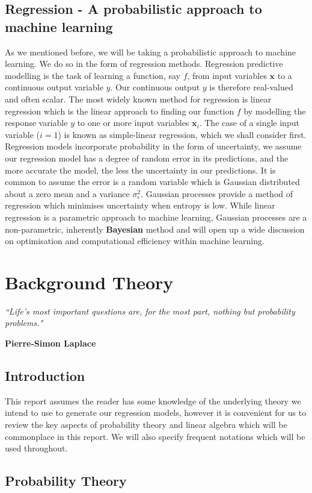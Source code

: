\documentclass[10pt,a4paper]{article}
\numberwithin{equation}{section}
\theoremstyle{plain}
\theoremstyle{own}
\begin{document}
\subsection*{Regression - A probabilistic approach to machine learning}
As we mentioned before, we will be taking a probabilistic approach to machine learning. We do so in the form of regression methods. Regression predictive modelling is the task of learning a function, say $f$, from input variables $\mathbf{x}$ to a continuous output variable $y$. Our continuous output $y$ is therefore real-valued and often scalar. The most widely known method for regression is linear regression which is the linear approach to finding our function $f$ by modelling the response variable $y$ to one or more input variables $\mathbf{x}_i$. The case of a single input variable ($i = 1$) is known as simple-linear regression, which we shall consider first. Regression models incorporate probability in the form of uncertainty, we assume our regression model has a degree of random error in its predictions, and the more accurate the model, the less the uncertainty in our predictions. It is common to assume the error is a random variable which is Gaussian distributed about a zero mean and a variance $\sigma_\epsilon^2$. Gaussian processes provide a method of regression which minimises uncertainty when entropy is low. While linear regression is a parametric approach to machine learning, Gaussian processes are a non-parametric, inherently \textbf{Bayesian} method and will open up a wide discussion on optimisation and computational efficiency within machine learning.
\pagebreak
\section{Background Theory}
\epigraph{\textit{``Life's most important questions are, for the most part, nothing but probability problems."}}{\textbf{Pierre-Simon Laplace}}
\subsection{Introduction}
This report assumes the reader has some knowledge of the underlying theory we intend to use to generate our regression models, however it is convenient for us to review the key aspects of probability theory and linear algebra which will be commonplace in this report. We will also specify frequent notations which will be used throughout.
\subsection{Probability Theory}
\end{document}
